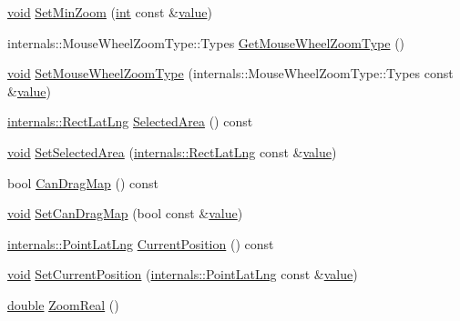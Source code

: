 \begin{DoxyCompactItemize}
\item 
\hyperlink{group___u_a_v_objects_plugin_ga444cf2ff3f0ecbe028adce838d373f5c}{void} \hyperlink{group___o_p_map_widget_gaf973bb53af546323b7714f8715bb527d}{Set\-Min\-Zoom} (\hyperlink{ioapi_8h_a787fa3cf048117ba7123753c1e74fcd6}{int} const \&\hyperlink{glext_8h_aa0e2e9cea7f208d28acda0480144beb0}{value})
\item 
internals\-::\-Mouse\-Wheel\-Zoom\-Type\-::\-Types \hyperlink{group___o_p_map_widget_gaccdd5b2b818dd9add21788954c49eabe}{Get\-Mouse\-Wheel\-Zoom\-Type} ()
\item 
\hyperlink{group___u_a_v_objects_plugin_ga444cf2ff3f0ecbe028adce838d373f5c}{void} \hyperlink{group___o_p_map_widget_ga24fd1f0f732f8306c89d00997f9957e1}{Set\-Mouse\-Wheel\-Zoom\-Type} (internals\-::\-Mouse\-Wheel\-Zoom\-Type\-::\-Types const \&\hyperlink{glext_8h_aa0e2e9cea7f208d28acda0480144beb0}{value})
\item 
\hyperlink{structinternals_1_1_rect_lat_lng}{internals\-::\-Rect\-Lat\-Lng} \hyperlink{group___o_p_map_widget_gaa5afd1049e526ae7424065bca8308106}{Selected\-Area} () const 
\item 
\hyperlink{group___u_a_v_objects_plugin_ga444cf2ff3f0ecbe028adce838d373f5c}{void} \hyperlink{group___o_p_map_widget_ga39fb72ad777f823ecaba3f30feb9e623}{Set\-Selected\-Area} (\hyperlink{structinternals_1_1_rect_lat_lng}{internals\-::\-Rect\-Lat\-Lng} const \&\hyperlink{glext_8h_aa0e2e9cea7f208d28acda0480144beb0}{value})
\item 
bool \hyperlink{group___o_p_map_widget_ga2c73815e5add0186091174a0dabad975}{Can\-Drag\-Map} () const 
\item 
\hyperlink{group___u_a_v_objects_plugin_ga444cf2ff3f0ecbe028adce838d373f5c}{void} \hyperlink{group___o_p_map_widget_ga8e9c310f8929536de86a8ed730abde94}{Set\-Can\-Drag\-Map} (bool const \&\hyperlink{glext_8h_aa0e2e9cea7f208d28acda0480144beb0}{value})
\item 
\hyperlink{structinternals_1_1_point_lat_lng}{internals\-::\-Point\-Lat\-Lng} \hyperlink{group___o_p_map_widget_ga5da99e2dca74bad302e2a35466a5a2fc}{Current\-Position} () const 
\item 
\hyperlink{group___u_a_v_objects_plugin_ga444cf2ff3f0ecbe028adce838d373f5c}{void} \hyperlink{group___o_p_map_widget_ga5144489a16c9bd07abbd0d8adc01656d}{Set\-Current\-Position} (\hyperlink{structinternals_1_1_point_lat_lng}{internals\-::\-Point\-Lat\-Lng} const \&\hyperlink{glext_8h_aa0e2e9cea7f208d28acda0480144beb0}{value})
\item 
\hyperlink{_super_l_u_support_8h_a8956b2b9f49bf918deed98379d159ca7}{double} \hyperlink{group___o_p_map_widget_gae56c86fccffa01f54944d431af98a7b9}{Zoom\-Real} ()

\end{DoxyCompactItemize}
